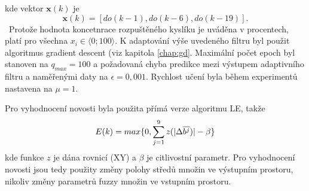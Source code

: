 \documentclass[11pt,twoside,openright]{report}
\DeclarePairedDelimiter\abs{\lvert}{\rvert}%
\begin{document}
\begin{appendices}
\begin{equation}
\end{equation}
kde vektor $\textbf{x}(k)$ je
\begin{equation}
    \textbf{x}(k)=[do(k-1),do(k-6),do(k-19)].
\end{equation}\
Protože hodnota koncetnrace rozpuštěného kyslíku je uváděna v procentech, platí pro všechna $x_i\in \langle 0;100\rangle$. K adaptování výše uvedeného filtru byl použit algoritmus gradient descent (viz kapitola \ref{chap:gd}. Maximální počet epoch byl stanoven na $q_{max}=100$ a požadovaná chyba predikce mezi výstupem adaptivního filtru a naměřenými daty na $\epsilon=0,001$. Rychlost učení byla během experimentů nastavena na $\mu=1$.
\par
Pro vyhodnocení novosti byla použita přímá verze algoritmu LE, takže
\begin{equation}\label{eq:le_putida}
    E(k)=max\{0, \sum_{j=1}^9 z(\abs{\Delta \overline{b^j})}-\beta\}
\end{equation}
kde funkce $z$ je dána rovnicí (XY) a $\beta$ je citlivostní parametr. Pro vyhodnocení novosti jsou tedy použity změny polohy středů množin ve výstupním prostoru, nikoliv změny parametrů fuzzy množin ve vstupním prostoru.


\end{appendices}
\end{document}
